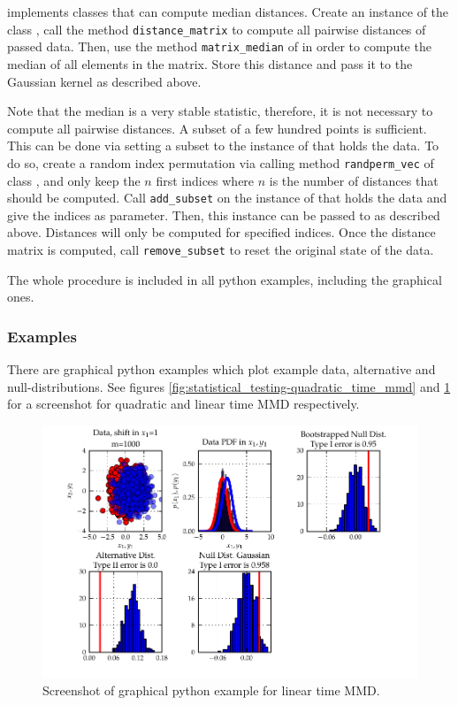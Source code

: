 \shogun{} implements classes that can compute median distances. Create an instance of the class , call the method \texttt{distance\_matrix} to compute all pairwise distances of passed data. Then, use the method \texttt{matrix\_median} of   in order to compute the median of all elements in the matrix. Store this distance and pass it to the Gaussian kernel as described above.

Note that the median is a very stable statistic, therefore, it is not necessary to compute all pairwise distances. A subset of a few hundred points is sufficient. This can be done via setting a subset to the instance of  that holds the data. To do so, create a random index permutation via calling method \texttt{randperm\_vec} of class , and only keep the $n$ first indices where $n$ is the number of distances that should be computed. Call \texttt{add\_subset} on the instance of  that holds the data and give the indices as parameter. Then, this instance can be passed to  as described above. Distances will only be computed for specified indices. Once the distance matrix is computed, call \texttt{remove\_subset} to reset the original state of the data.

The whole procedure is included in all python examples, including the graphical ones.

\subsubsection{Examples}
There are graphical python examples which plot example data, alternative and null-distributions. See figures \ref{fig:statistical_testing-quadratic_time_mmd} and \ref{fig:statistical_testing-linear_time_mmd} for a screenshot for quadratic and linear time MMD respectively.

\begin{figure}\centering
		\includegraphics{fig/statistical_testing/linear_time_mmd}
		\caption{Screenshot of graphical python example for linear time MMD.}
		\label{fig:statistical_testing-linear_time_mmd}
\end{figure}

